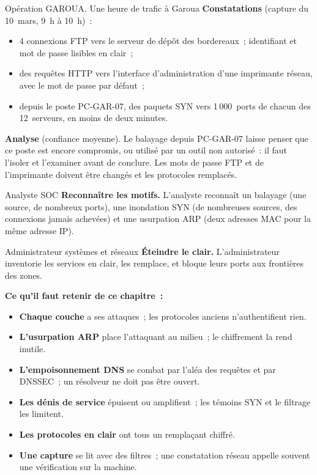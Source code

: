 \begin{boxscenario}{Opération GAROUA. Une heure de trafic à Garoua}
\textbf{Constatations} (capture du 10~mars, 9~h à 10~h)~:
\begin{itemize}
    \item 4 connexions FTP vers le serveur de dépôt des bordereaux~;
          identifiant et mot de passe lisibles en clair~;
    \item des requêtes HTTP vers l'interface d'administration d'une
          imprimante réseau, avec le mot de passe par défaut~;
    \item depuis le poste PC-GAR-07, des paquets SYN vers 1\,000~ports de
          chacun des 12~serveurs, en moins de deux minutes.
\end{itemize}

\textbf{Analyse} (confiance moyenne). Le balayage depuis PC-GAR-07 laisse
penser que ce poste est encore compromis, ou utilisé par un outil non
autorisé~: il faut l'isoler et l'examiner avant de conclure. Les mots de
passe FTP et de l'imprimante doivent être changés et les protocoles
remplacés.
\end{boxscenario}

\begin{boxmetier}{Analyste SOC}
\textbf{Reconnaître les motifs.} L'analyste reconnaît un balayage (une
source, de nombreux ports), une inondation SYN (de nombreuses sources, des
connexions jamais achevées) et une usurpation ARP (deux adresses MAC pour
la même adresse IP).
\end{boxmetier}

\begin{boxmetier}{Administrateur systèmes et réseaux}
\textbf{Éteindre le clair.} L'administrateur inventorie les services en
clair, les remplace, et bloque leurs ports aux frontières des zones.
\end{boxmetier}

\separateur

\begin{boxresume}
\textbf{Ce qu'il faut retenir de ce chapitre~:}
\begin{itemize}
    \item \textbf{Chaque couche} a ses attaques~; les protocoles anciens
          n'authentifient rien.
    \item \textbf{L'usurpation ARP} place l'attaquant au milieu~; le
          chiffrement la rend inutile.
    \item \textbf{L'empoisonnement DNS} se combat par l'aléa des requêtes
          et par DNSSEC~; un résolveur ne doit pas être ouvert.
    \item \textbf{Les dénis de service} épuisent ou amplifient~; les
          témoins SYN et le filtrage les limitent.
    \item \textbf{Les protocoles en clair} ont tous un remplaçant chiffré.
    \item \textbf{Une capture} se lit avec des filtres~; une constatation
          réseau appelle souvent une vérification sur la machine.
\end{itemize}
\end{boxresume}

